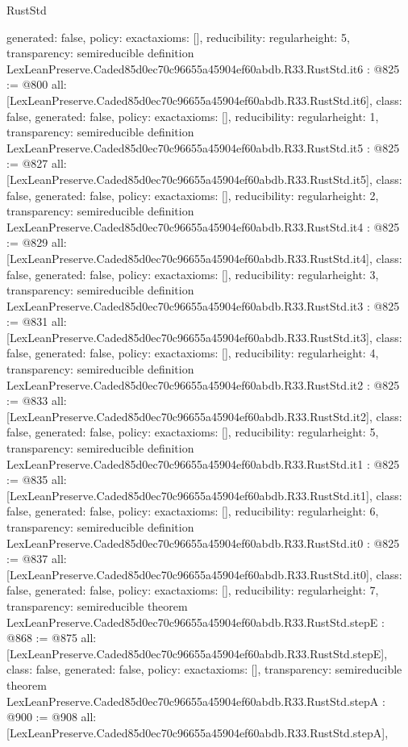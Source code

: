 \begin{lexlean}{RustStd}
\begin{coremodule}
{  generated: false,
  policy: exact{axioms: []},
  reducibility: regular{height: 5},
  transparency: semireducible
}
definition LexLeanPreserve.Caded85d0ec70c96655a45904ef60abdb.R33.RustStd.it6 : @825 := @800 {
  all: [LexLeanPreserve.Caded85d0ec70c96655a45904ef60abdb.R33.RustStd.it6],
  class: false,
  generated: false,
  policy: exact{axioms: []},
  reducibility: regular{height: 1},
  transparency: semireducible
}
definition LexLeanPreserve.Caded85d0ec70c96655a45904ef60abdb.R33.RustStd.it5 : @825 := @827 {
  all: [LexLeanPreserve.Caded85d0ec70c96655a45904ef60abdb.R33.RustStd.it5],
  class: false,
  generated: false,
  policy: exact{axioms: []},
  reducibility: regular{height: 2},
  transparency: semireducible
}
definition LexLeanPreserve.Caded85d0ec70c96655a45904ef60abdb.R33.RustStd.it4 : @825 := @829 {
  all: [LexLeanPreserve.Caded85d0ec70c96655a45904ef60abdb.R33.RustStd.it4],
  class: false,
  generated: false,
  policy: exact{axioms: []},
  reducibility: regular{height: 3},
  transparency: semireducible
}
definition LexLeanPreserve.Caded85d0ec70c96655a45904ef60abdb.R33.RustStd.it3 : @825 := @831 {
  all: [LexLeanPreserve.Caded85d0ec70c96655a45904ef60abdb.R33.RustStd.it3],
  class: false,
  generated: false,
  policy: exact{axioms: []},
  reducibility: regular{height: 4},
  transparency: semireducible
}
definition LexLeanPreserve.Caded85d0ec70c96655a45904ef60abdb.R33.RustStd.it2 : @825 := @833 {
  all: [LexLeanPreserve.Caded85d0ec70c96655a45904ef60abdb.R33.RustStd.it2],
  class: false,
  generated: false,
  policy: exact{axioms: []},
  reducibility: regular{height: 5},
  transparency: semireducible
}
definition LexLeanPreserve.Caded85d0ec70c96655a45904ef60abdb.R33.RustStd.it1 : @825 := @835 {
  all: [LexLeanPreserve.Caded85d0ec70c96655a45904ef60abdb.R33.RustStd.it1],
  class: false,
  generated: false,
  policy: exact{axioms: []},
  reducibility: regular{height: 6},
  transparency: semireducible
}
definition LexLeanPreserve.Caded85d0ec70c96655a45904ef60abdb.R33.RustStd.it0 : @825 := @837 {
  all: [LexLeanPreserve.Caded85d0ec70c96655a45904ef60abdb.R33.RustStd.it0],
  class: false,
  generated: false,
  policy: exact{axioms: []},
  reducibility: regular{height: 7},
  transparency: semireducible
}
theorem LexLeanPreserve.Caded85d0ec70c96655a45904ef60abdb.R33.RustStd.stepE : @868 := @875 {
  all: [LexLeanPreserve.Caded85d0ec70c96655a45904ef60abdb.R33.RustStd.stepE],
  class: false,
  generated: false,
  policy: exact{axioms: []},
  transparency: semireducible
}
theorem LexLeanPreserve.Caded85d0ec70c96655a45904ef60abdb.R33.RustStd.stepA : @900 := @908 {
  all: [LexLeanPreserve.Caded85d0ec70c96655a45904ef60abdb.R33.RustStd.stepA],
}
\end{coremodule}
\end{lexlean}
